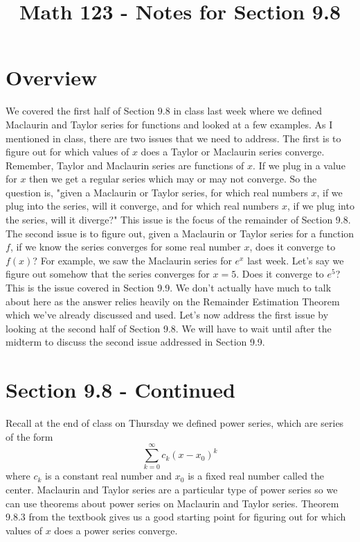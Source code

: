 \documentclass{article}
\title{Math 123 - Notes for Section 9.8}
\author{}
\date{}
\begin{document}
\maketitle

\section*{Overview}
We covered the first half of Section 9.8 in class last week where we defined Maclaurin and Taylor series for functions and looked at a few examples. As I mentioned in class, there are two issues that we need to address. The first is to figure out for which values of $x$ does a Taylor or Maclaurin series converge. Remember, Taylor and Maclaurin series are functions of $x$. If we plug in a value for $x$ then we get a regular series which may or may not converge. So the question is, "given a Maclaurin or Taylor series, for which real numbers $x$, if we plug into the series, will it converge, and for which real numbers $x$, if we plug into the series, will it diverge?" This issue is the focus of the remainder of Section 9.8. The second issue is to figure out, given a Maclaurin or Taylor series for a function $f$, if we know the series converges for some real number $x$, does it converge to $f(x)$? For example, we saw the Maclaurin series for $e^x$ last week. Let's say we figure out somehow that the series converges for $x = 5$. Does it converge to $e^5$? This is the issue covered in Section 9.9. We don't actually have much to talk about here as the answer relies heavily on the Remainder Estimation Theorem which we've already discussed and used. Let's now address the first issue by looking at the second half of Section 9.8. We will have to wait until after the midterm to discuss the second issue addressed in Section 9.9.

\section*{Section 9.8 - Continued}
Recall at the end of class on Thursday we defined power series, which are series of the form
\[
\sum_{k=0}^{\infty} c_k (x - x_0)^k
\]
where $c_k$ is a constant real number and $x_0$ is a fixed real number called the center. Maclaurin and Taylor series are a particular type of power series so we can use theorems about power series on Maclaurin and Taylor series. Theorem 9.8.3 from the textbook gives us a good starting point for figuring out for which values of $x$ does a power series converge.
\end{document}
